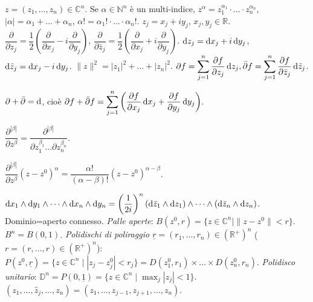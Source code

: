 $z=(z_1, \dots, z_n) \in \mathbb{C}^n$. Se $\alpha \in \mathbb{N}^n$ è un multi-indice, $z^{\alpha}=z_1^{\alpha_1}\cdot \ldots \cdot z_n^{\alpha_n}$, $|\alpha|=\alpha_1+\dots+\alpha_n$, $\alpha!=\alpha_1!\cdot\ldots\cdot\alpha_n!$.
$z_j=x_j+iy_j$, $x_j,y_j \in \mathbb{R}$. $\dfrac{\partial}{\partial z_j}=\dfrac{1}{2}\left(\dfrac{\partial}{\partial x_j}-i\dfrac{\partial}{\partial y_j}\right)$, $\dfrac{\partial}{\partial\bar{z}_j}=\dfrac{1}{2}\left(\dfrac{\partial}{\partial x_j}+i\dfrac{\partial}{\partial y_j}\right)$.
$\mathop{}\!\mathrm{d} z_j=\mathop{}\!\mathrm{d} x_j+i\mathop{}\!\mathrm{d} y_j$, $\mathop{}\!\mathrm{d}\bar{z}_j=\mathop{}\!\mathrm{d} x_j-i\mathop{}\!\mathrm{d} y_j$. $\|z\|^2=|z_1|^2+\dots+|z_n|^2$. $\displaystyle \partial f=\sum_{j=1}^n \dfrac{\partial f}{\partial z_j}\mathop{}\!\mathrm{d} z_j, \bar{\partial} f=\sum_{j=1}^n \dfrac{\partial f}{\partial \bar{z}_j}\mathop{}\!\mathrm{d} \bar{z}_j$.

\begin{exc}
  $\partial+\bar{\partial}=\mathop{}\!\mathrm{d}$, cioè $\displaystyle \partial f+\bar{\partial}f=\sum_{j=1}^n \left(\dfrac{\partial f}{\partial x_j}\mathop{}\!\mathrm{d} x_j+\dfrac{\partial f}{\partial y_j}\mathop{}\!\mathrm{d} y_j\right)$.
\end{exc}

$\dfrac{\partial^{|\beta|}}{\partial z^\beta}=\dfrac{\partial^{|\beta|}}{\partial z_1^{\beta_1}\dots\partial z_n^{\beta_n}}$.

\begin{exc}
  $\dfrac{\partial^{|\beta|}}{\partial z^\beta}(z-z^0)^\alpha=\dfrac{\alpha!}{(\alpha-\beta)!}(z-z^0)^{\alpha-\beta}$.
\end{exc}

$\diff x_1 \wedge \diff y_1 \wedge \dots \wedge \diff x_n \wedge \diff y_n=\left(\dfrac{1}{2i}\right)^n(\diff\bar{z}_1\wedge \diff z_1)\wedge \dots \wedge (\diff\bar{z}_n \wedge \diff z_n)$.
Dominio=aperto connesso. \textit{Palle aperte}: $B(z^0, r)=\{z \in \mathbb{C}^n \mid \|z-z^0\|<r\}$. $B^n=B(0,1)$.
\textit{Polidischi di poliraggio $\underline{r}=(r_1,\dots,r_n) \in (\mathbb{R}^+)^n$} ($r=(r, \dots, r) \in (\mathbb{R}^+)^n$): $P(z^0, \underline{r})=\{z \in \mathbb{C}^n \mid |z_j-z_j^0|<r_j\}=D(z_1^0, r_1) \times \dots \times D(z_n^0, r_n)$.
\textit{Polidisco unitario}: $\displaystyle \mathbb{D}^n=P(0, \underline{1})=\{z \in \mathbb{C}^n \mid \max_j |z_j|<1\}$. $(z_1, \dots, \hat{z}_j,\dots, z_n)=(z_1, \dots, z_{j-1}, z_{j+1}, \dots, z_n)$.

